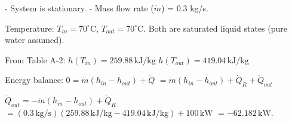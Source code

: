 - System is stationary.  
- Mass flow rate (\( \dot{m} \)) = 0.3 kg/s.  

Temperature: \( T_{in} = 70^\circ \text{C} \), \( T_{out} = 70^\circ \text{C} \). Both are saturated liquid states (pure water assumed).  

From Table A-2:  
\( h(T_{in}) = 259.88 \, \text{kJ/kg} \)  
\( h(T_{out}) = 419.04 \, \text{kJ/kg} \)  

Energy balance:  
\( 0 = \dot{m}(h_{in} - h_{out}) + \dot{Q} \)  
\( = \dot{m}(h_{in} - h_{out}) + \dot{Q}_R + \dot{Q}_{out} \)  

\( \dot{Q}_{out} = -\dot{m}(h_{in} - h_{out}) + \dot{Q}_R \)  
\( = (0.3 \, \text{kg/s})(259.88 \, \text{kJ/kg} - 419.04 \, \text{kJ/kg}) + 100 \, \text{kW} \)  
\( = -62.182 \, \text{kW} \).